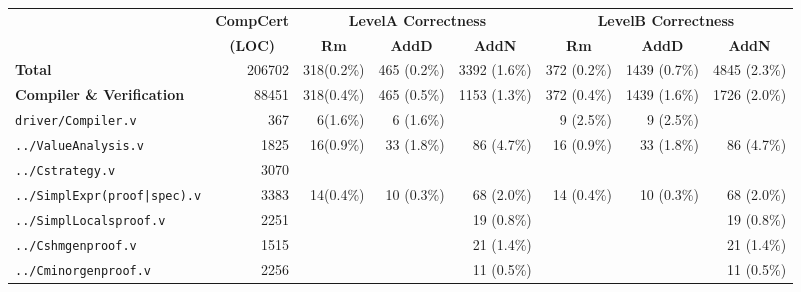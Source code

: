 \begin{tabular}{|l||r||r|r|r||r|r|r|}
\hline
& \multicolumn{1}{c||}{\textbf{CompCert}} & \multicolumn{3}{c||}{\textbf{LevelA Correctness}} & \multicolumn{3}{c|}{\textbf{LevelB Correctness}} \\
\cline{3-8} 
 & \multicolumn{1}{c||}{\textbf{(LOC)}} & \multicolumn{1}{c|}{\textbf{Rm}} & \multicolumn{1}{c|}{\textbf{AddD}} & \multicolumn{1}{c||}{\textbf{AddN}} & \multicolumn{1}{c|}{\textbf{Rm}} & \multicolumn{1}{c|}{\textbf{AddD}} & \multicolumn{1}{c|}{\textbf{AddN}} \\
\hline 
\textbf{Total} & 206702 & 318\phantom{0}(0.2\%) & 465 \phantom{0}(0.2\%) & 3392 \phantom{0}(1.6\%) & 372 \phantom{0}(0.2\%) & 1439 \phantom{0}(0.7\%) & 4845 \phantom{0}(2.3\%) \\
\hline 
\hline
\textbf{Compiler \& Verification} & 88451 & 318\phantom{0}(0.4\%) & 465 \phantom{0}(0.5\%) & 1153 \phantom{0}(1.3\%) & 372 \phantom{0}(0.4\%) & 1439 \phantom{0}(1.6\%) & 1726 \phantom{0}(2.0\%) \\
\hline 
\texttt{driver/Compiler.v} & 367 & 6\phantom{0}(1.6\%) & 6 \phantom{0}(1.6\%) & \phantom{ (00.0\%)} & 9 \phantom{0}(2.5\%) & 9 \phantom{0}(2.5\%) & \phantom{ (00.0\%)} \\
\texttt{../ValueAnalysis.v} & 1825 & 16\phantom{0}(0.9\%) & 33 \phantom{0}(1.8\%) & 86 \phantom{0}(4.7\%) & 16 \phantom{0}(0.9\%) & 33 \phantom{0}(1.8\%) & 86 \phantom{0}(4.7\%) \\
\texttt{../Cstrategy.v} & 3070 & \phantom{ (00.0\%)} & \phantom{ (00.0\%)} & \phantom{ (00.0\%)} & \phantom{ (00.0\%)} & \phantom{ (00.0\%)} & \phantom{ (00.0\%)} \\
\texttt{../SimplExpr(proof|spec).v} & 3383 & 14\phantom{0}(0.4\%) & 10 \phantom{0}(0.3\%) & \cellcolor[gray]{0.8}68 \phantom{0}(2.0\%) & 14 \phantom{0}(0.4\%) & 10 \phantom{0}(0.3\%) & 68 \phantom{0}(2.0\%) \\
\texttt{../SimplLocalsproof.v} & 2251 & \phantom{ (00.0\%)} & \phantom{ (00.0\%)} & 19 \phantom{0}(0.8\%) & \phantom{ (00.0\%)} & \phantom{ (00.0\%)} & 19 \phantom{0}(0.8\%) \\
\texttt{../Cshmgenproof.v} & 1515 & \phantom{ (00.0\%)} & \phantom{ (00.0\%)} & 21 \phantom{0}(1.4\%) & \phantom{ (00.0\%)} & \phantom{ (00.0\%)} & 21 \phantom{0}(1.4\%) \\
\texttt{../Cminorgenproof.v} & 2256 & \phantom{ (00.0\%)} & \phantom{ (00.0\%)} & 11 \phantom{0}(0.5\%) & \phantom{ (00.0\%)} & \phantom{ (00.0\%)} & 11 \phantom{0}(0.5\%) \\

\end{tabular}
